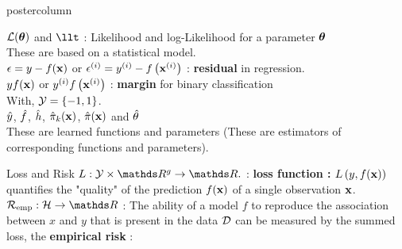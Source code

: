\documentclass{beamer}
\begin{document}
\begin{frame}[fragile]{}
\begin{columns}
\begin{column}{.31\textwidth}
\begin{beamercolorbox}[center]{postercolumn}
\begin{minipage}{.98\textwidth}
{\begin{myblock}{}
              $\mathcal{L}(\bm{\theta})$ and $\llt$ : Likelihood and log-Likelihood for a parameter $\bm{\theta}$ \\
                \hspace*{1ex}These are based on a statistical model.\\
               
              $\epsilon = y - f(\mathbf{x})$ or $\epsilon^{(i)} = y^{(i)} - f\left(\mathbf{x}^{(i)}\right)$ : \textbf{residual} in regression.\\

              $y f(\mathbf{x})$ or $y^{(i)} f\left(\mathbf{x}^{(i)}\right)$ : \textbf{margin} for binary classification \\
                \hspace*{1ex}With, $\mathcal{Y} = \{-1, 1\}$. \\
              
              $\hat{y}$, $\hat{f}$, $\hat{h}$, $\hat \pi_{k}(\mathbf{x})$, $\hat \pi(\mathbf{x})$ and $\hat{\theta}$ \\
                \hspace*{1ex}These are learned functions and parameters (These are estimators of \hspace*{1ex}corresponding functions and parameters).
					\end{myblock}
          \begin{myblock}{Loss and Risk}
				    $L: \Yspace \times \R^g \to \R.$ : \textbf{loss function : } $L\left(y, f(\mathbf{x})\right)$ quantifies the "quality" of the prediction $f(\mathbf{x})$ of a single observation $\mathbf{x}$.  \\
            
            $\riske:  \Hspace \to \R $ :  The ability of a model $f$ to reproduce the association between $x$ and $y$ that is present in the data $\mathcal{D}$ can be measured by the summed loss, the \textbf{empirical risk }:
            

\end{myblock}}
\end{minipage}
\end{beamercolorbox}
\end{column}
\end{columns}
\end{frame}
\end{document}
